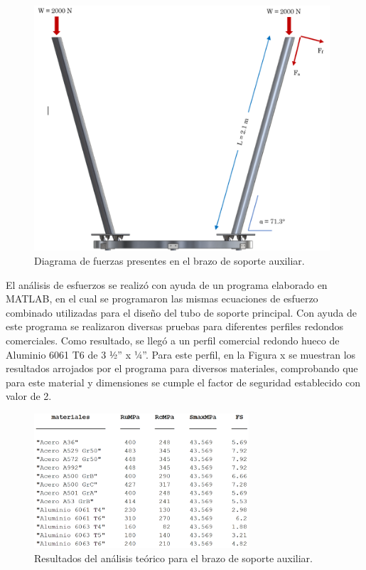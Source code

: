 \begin{figure}[H]
	\centering
	\includegraphics[width=11cm]{imagenes/rol3}
	\caption{Diagrama de fuerzas presentes en el brazo de soporte auxiliar.}
	\label{fig:rol3}
\end{figure}

El análisis de esfuerzos se realizó con ayuda de un programa elaborado en MATLAB, en el cual se programaron las mismas ecuaciones de esfuerzo combinado utilizadas para el diseño del tubo de soporte principal. Con ayuda de este programa se realizaron diversas pruebas para diferentes perfiles redondos comerciales. Como resultado, se llegó a un perfil comercial redondo hueco de Aluminio 6061 T6 de 3 ½” x ¼”. Para este perfil, en la Figura x se muestran los resultados arrojados por el programa para diversos materiales, comprobando que para este material y dimensiones se cumple el factor de seguridad establecido con valor de 2.

\begin{figure}[H]
	\centering
	\includegraphics[width=8cm]{imagenes/rol4}
	\caption{Resultados del análisis teórico para el brazo de soporte auxiliar.}
	\label{fig:rol4}
\end{figure}

